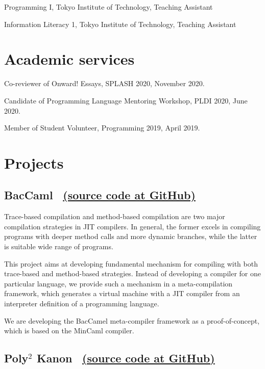 \documentclass[11pt]{article} %
\newcommand{\伊澤侑祐}{\underline{伊澤侑祐}}
\newcommand{\jit}{\textsc{JIT} }
\begin{document}
 Programming I, Tokyo Institute of Technology, Teaching Assistant

 Information Literacy 1, Tokyo Institute of Technology, Teaching Assistant


\section*{Academic services}

 Co-reviewer of Onward! Essays, SPLASH 2020, November 2020.

 Candidate of Programming Language Mentoring Workshop, PLDI 2020, June 2020.

 Member of Student Volunteer, Programming 2019, April 2019.

\section*{Projects}

\subsection*{BacCaml \, \href{https://github.com/prg-titech/baccaml}{(source code at GitHub)}}

\medskip

Trace-based compilation and method-based compilation are two major compilation
strategies in \jit compilers. In general, the former excels in  compiling
programs with deeper method calls and more dynamic branches, while  the latter
is suitable wide range of programs.

\medskip

This project aims at developing fundamental mechanism for compiling with both
trace-based and method-based strategies. Instead of developing  a compiler for
one particular language, we provide such a mechanism in a meta-compilation
framework, which generates a virtual machine with a \jit compiler from an
interpreter definition of a programming language.

\medskip

We are developing the BacCamel meta-compiler framework as a proof-of-concept,
which is based on the MinCaml compiler.

\medskip

\subsection*{Poly$^2$ Kanon \,
  \href{https://github.com/prg-titech/Kanon}{(source code at GitHub)}}
\end{document}
